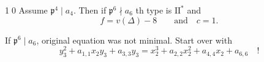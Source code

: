 \textcircled{\scriptsize 10} Assume $\boxed{\mathfrak p^4\mid a_4}$. Then if $\mathfrak p^6\nmid a_6$ th type is $\mathrm{II}^{*}$ and
\[
 f=v(\Delta)-8\qquad\text{and}\quad c=1.
\]
\normalmarginpar

If $\mathfrak p^6\mid a_6$, original equation was not minimal. Start over with
\[
 y_3^2+a_{1,1}x_2y_3+a_{3,3}y_3=x_2^3+a_{2,2}x_2^2+a_{4,4}x_2+a_{6,6}\quad!
\]
\endgroup
